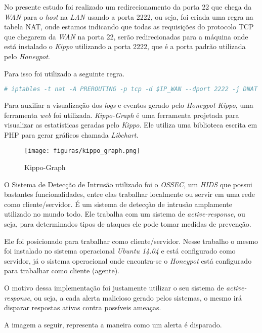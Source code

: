 No presente estudo foi realizado um redirecionamento da porta 22 que chega da \textit{WAN} para o \textit{host} na \textit{LAN} usando a porta 2222, ou seja, foi criada uma regra na tabela NAT, onde estamos indicando que todas as requisições do protocolo TCP que chegarem da \textit{WAN} na porta 22, serão redirecionadas para a máquina onde está instalado o \textit{Kippo} utilizando a porta 2222, que é a porta padrão utilizada pelo \textit{Honeypot}. 

Para isso foi utilizado a seguinte regra.

\begin{lstlisting}[language=bash]
# iptables -t nat -A PREROUTING -p tcp -d $IP_WAN --dport 2222 -j DNAT --to $IP_HOST:22
\end{lstlisting}

Para auxiliar a visualização dos \textit{logs} e eventos gerado pelo \textit{Honeypot Kippo}, uma ferramenta \textit{web} foi utilizada. \textit{Kippo-Graph} é uma ferramenta projetada para visualizar as estatísticas geradas pelo \textit{Kippo}. Ele utiliza uma biblioteca escrita em PHP para gerar gráficos chamada \textit{Libchart}.

\begin{figure}[!h]
\centering
\texttt{[image: figuras/kippo\_graph.png]}
\caption{Kippo-Graph} 	
\end{figure}

O Sistema de Detecção de Intrusão utilizado foi o \textit{OSSEC}, um \textit{HIDS} que possui bastantes funcionalidades, entre elas trabalhar localmente ou servir em uma rede como cliente/servidor. É um sistema de detecção de intrusão amplamente utilizado no mundo todo. Ele trabalha com um sistema de \textit{active-response}, ou seja, para determinados tipos de ataques ele pode tomar medidas de prevenção.

Ele foi posicionado para trabalhar como cliente/servidor. Nesse trabalho o mesmo foi instalado no sistema operacional \textit{Ubuntu 14.04} e está configurado como servidor, já o sistema operacional onde encontra-se o \textit{Honeypot} está configurado para trabalhar como cliente (agente).

O motivo dessa implementação foi justamente utilizar o seu sistema de \textit{active-response}, ou seja, a cada alerta malicioso gerado pelos sistemas, o mesmo irá disparar respostas ativas contra possíveis ameaças.

A imagem a seguir, representa a maneira como um alerta é disparado.

